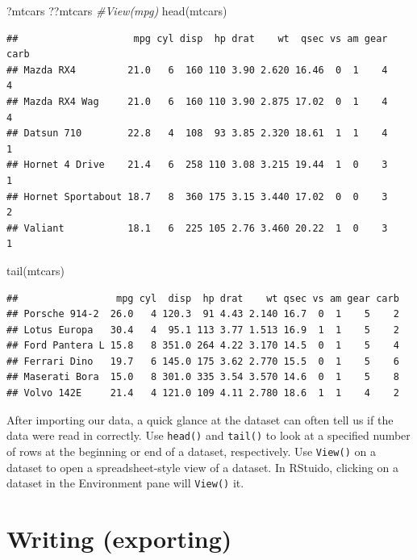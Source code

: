 \documentclass[
]{book}
\newenvironment{Shaded}{\begin{snugshade}}{\end{snugshade}}
\newcommand{\CommentTok}[1]{\textcolor[rgb]{0.56,0.35,0.01}{\textit{#1}}}
\newcommand{\FunctionTok}[1]{\textcolor[rgb]{0.00,0.00,0.00}{#1}}
\newcommand{\NormalTok}[1]{#1}
\begin{document}
\begin{Shaded}
\begin{Highlighting}[]
\NormalTok{?mtcars}
\NormalTok{??mtcars}
\CommentTok{\#View(mpg)}
\FunctionTok{head}\NormalTok{(mtcars)}
\end{Highlighting}
\end{Shaded}

\begin{verbatim}
##                    mpg cyl disp  hp drat    wt  qsec vs am gear carb
## Mazda RX4         21.0   6  160 110 3.90 2.620 16.46  0  1    4    4
## Mazda RX4 Wag     21.0   6  160 110 3.90 2.875 17.02  0  1    4    4
## Datsun 710        22.8   4  108  93 3.85 2.320 18.61  1  1    4    1
## Hornet 4 Drive    21.4   6  258 110 3.08 3.215 19.44  1  0    3    1
## Hornet Sportabout 18.7   8  360 175 3.15 3.440 17.02  0  0    3    2
## Valiant           18.1   6  225 105 2.76 3.460 20.22  1  0    3    1
\end{verbatim}

\begin{Shaded}
\begin{Highlighting}[]
\FunctionTok{tail}\NormalTok{(mtcars)}
\end{Highlighting}
\end{Shaded}

\begin{verbatim}
##                 mpg cyl  disp  hp drat    wt qsec vs am gear carb
## Porsche 914-2  26.0   4 120.3  91 4.43 2.140 16.7  0  1    5    2
## Lotus Europa   30.4   4  95.1 113 3.77 1.513 16.9  1  1    5    2
## Ford Pantera L 15.8   8 351.0 264 4.22 3.170 14.5  0  1    5    4
## Ferrari Dino   19.7   6 145.0 175 3.62 2.770 15.5  0  1    5    6
## Maserati Bora  15.0   8 301.0 335 3.54 3.570 14.6  0  1    5    8
## Volvo 142E     21.4   4 121.0 109 4.11 2.780 18.6  1  1    4    2
\end{verbatim}

After importing our data, a quick glance at the dataset can often tell us if the data were read in correctly. Use \texttt{head()} and \texttt{tail()} to look at a specified number of rows at the beginning or end of a dataset, respectively. Use \texttt{View()} on a dataset to open a spreadsheet-style view of a dataset. In RStuido, clicking on a dataset in the Environment pane will \texttt{View()} it.

\hypertarget{writing-exporting}{%
\section{Writing (exporting)}\label{writing-exporting}}
\end{document}
